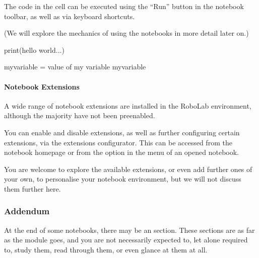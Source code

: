 \documentclass[letterpaper,10pt,english]{sphinxmanual}
\let\sphinxpxdimen\pdfpxdimen\else\newdimen\sphinxpxdimen
\begin{document}
The code in the cell can be executed using the “Run” button in the notebook toolbar, as well as via keyboard shortcuts.

(We will explore the mechanics of using the notebooks in more detail later on.)

{
\begin{sphinxVerbatim}[commandchars=\\\{\}]
\llap{\color{nbsphinxin}[ ]:\,\hspace{\fboxrule}\hspace{\fboxsep}}print(\PYGZdq{}hello world...\PYGZdq{})

my\PYGZus{}variable = \PYGZdq{}value of my variable\PYGZdq{}
my\PYGZus{}variable
\end{sphinxVerbatim}
}


\paragraph{Notebook Extensions}
\label{\detokenize{content/00_SOFTWARE_GUIDE/Section_00_01_Jupyter_environment:Notebook-Extensions}}
A wide range of notebook extensions are installed in the RoboLab environment, although the majority have not been pre\sphinxhyphen{}enabled.

You can enable and disable extensions, as well as further configuring certain extensions, via the extensions configurator. This can be accessed from the notebook homepage or from the  option in the  menu of an opened notebook.

\noindent\sphinxincludegraphics[width=1858\sphinxpxdimen,height=1440\sphinxpxdimen]{{00_01_nbextension_config}.png}

You are welcome to explore the available extensions, or even add further ones of your own, to personalise your notebook environment, but we will not discuss them further here.



\subsubsection{Addendum}
\label{\detokenize{content/00_SOFTWARE_GUIDE/Section_00_01_Jupyter_environment:Addendum}}
At the end of some notebooks, there may be an  section. These sections are  as far as the module goes, and you are not necessarily expected to, let alone required to, study them, read through them, or even glance at them at all.
\end{document}
